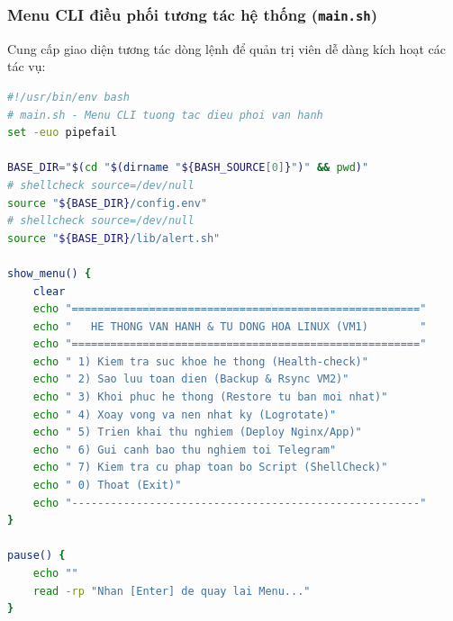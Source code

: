 \documentclass[a4paper,12pt]{article}
\begin{document}
\subsubsection{Menu CLI điều phối tương tác hệ thống (\texttt{main.sh})}
Cung cấp giao diện tương tác dòng lệnh để quản trị viên dễ dàng kích hoạt các tác vụ:
\begin{lstlisting}[language=bash,frame=single,basicstyle=\ttfamily\scriptsize]
#!/usr/bin/env bash
# main.sh - Menu CLI tuong tac dieu phoi van hanh
set -euo pipefail

BASE_DIR="$(cd "$(dirname "${BASH_SOURCE[0]}")" && pwd)"
# shellcheck source=/dev/null
source "${BASE_DIR}/config.env"
# shellcheck source=/dev/null
source "${BASE_DIR}/lib/alert.sh"

show_menu() {
    clear
    echo "======================================================"
    echo "   HE THONG VAN HANH & TU DONG HOA LINUX (VM1)        "
    echo "======================================================"
    echo " 1) Kiem tra suc khoe he thong (Health-check)"
    echo " 2) Sao luu toan dien (Backup & Rsync VM2)"
    echo " 3) Khoi phuc he thong (Restore tu ban moi nhat)"
    echo " 4) Xoay vong va nen nhat ky (Logrotate)"
    echo " 5) Trien khai thu nghiem (Deploy Nginx/App)"
    echo " 6) Gui canh bao thu nghiem toi Telegram"
    echo " 7) Kiem tra cu phap toan bo Script (ShellCheck)"
    echo " 0) Thoat (Exit)"
    echo "------------------------------------------------------"
}

pause() {
    echo ""
    read -rp "Nhan [Enter] de quay lai Menu..."
}


\end{lstlisting}
\end{document}
